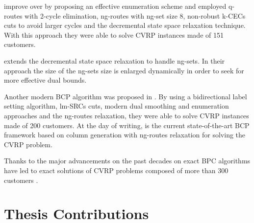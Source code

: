 \textcite{contardo2014} improve over \textcite{contardo2011}
by proposing an effective enumeration scheme and employed
q-routes with 2-cycle elimination, ng-routes with ng-set size 8,
non-robust k-CECs cuts to avoid larger cycles
and the decremental state space relaxation technique.
With this approach they were able to solve CVRP instances made of 151 customers.

\textcite{martinelli2014} extends the decremental state space relaxation
to handle ng-sets.
In their approach the size of the ng-sets size
is enlarged dynamically in order to seek for more effective dual bounds.


Another modern BCP algorithm was proposed in \textcite{pecin2017}.
By using a bidirectional label setting algorithm,
lm-SRCs cuts, modern dual smoothing and enumeration approaches
and the ng-routes relaxation, they were able to solve CVRP instances made of 200 customers.
At the day of writing, \textcite{pessoa2020a} is the current state-of-the-art
BCP framework based on column generation with ng-routes relaxation
for solving the CVRP problem.

Thanks to the major advancements on the past decades
on exact BPC algorithms
have led to exact solutions of CVRP problems composed of
more than 300 customers \parencite{costa2019}.

\section{Thesis Contributions}
\label{sec:intro-thesis-contributions}

